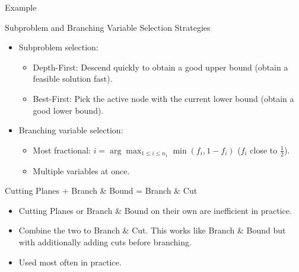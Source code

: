\begin{frame}{Example}
\only<1>{
\begin{figure}
\centering

\end{figure}
}
\end{frame}

\begin{frame}{Subproblem and Branching Variable Selection Strategies}
\begin{itemize}
\item Subproblem selection:
\begin{itemize}
\item Depth-First: Descend quickly to obtain a good upper bound (obtain a feasible solution fast).
\item Best-First: Pick the active node with the current lower bound (obtain a good lower bound).
\end{itemize}

\item Branching variable selection:
\begin{itemize}
\item Most fractional: $i = \arg \max_{1 \leq i \leq n_1} \min (f_i, 1-f_i)$ ($f_i$ close to $\frac{1}{2}$).
\item Multiple variables at once.
\end{itemize}
\end{itemize}
\end{frame}

\begin{frame}{Cutting Planes + Branch \& Bound = Branch \& Cut }
\begin{itemize}
\item Cutting Planes or Branch \& Bound on their own are inefficient in practice.
\item Combine the two to Branch \& Cut. This works like Branch \& Bound but with additionally adding cuts before branching. 
\item Used most often in practice. %
\end{itemize}
\end{frame}